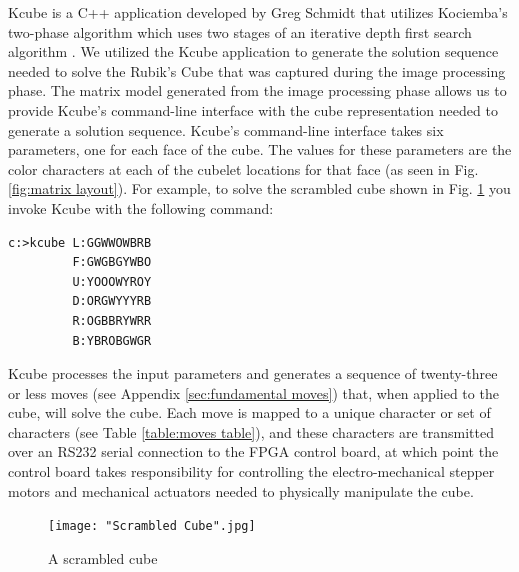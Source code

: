 \documentclass[final, letterpaper, 10 pt, conference, twocolumn]{IEEEtran}
\begin{document}
\label{sec:Kcube}
Kcube is a C++ application developed by Greg Schmidt that utilizes Kociemba's two-phase algorithm which uses two stages of an iterative depth first search algorithm \cite{TheTwo-PhaseAlgorithm}. We utilized the Kcube application to generate the solution sequence needed to solve the Rubik's Cube that was captured during the image processing phase. The matrix model generated from the image processing phase allows us to provide Kcube's command-line interface with the cube representation needed to generate a solution sequence. Kcube's command-line interface takes six parameters, one for each face of the cube. The values for these parameters are the color characters at each of the cubelet locations for that face (as seen in Fig. \ref{fig:matrix layout}). For example, to solve the scrambled cube shown in Fig. \ref{fig:scrambled cube} you invoke Kcube with the following command:

\begin{lstlisting}[style=DOS]
c:>kcube L:GGWWOWBRB
         F:GWGBGYWBO
         U:YOOOWYROY
         D:ORGWYYYRB
         R:OGBBRYWRR
         B:YBROBGWGR
\end{lstlisting}

Kcube processes the input parameters and generates a sequence of twenty-three or less moves (see Appendix \ref{sec:fundamental moves}) that, when applied to the cube, will solve the cube. Each move is mapped to a unique character or set of characters (see Table \ref{table:moves table}), and these characters are transmitted over an RS232 serial connection to the FPGA control board, at which point the control board takes responsibility for controlling the electro-mechanical stepper motors and mechanical actuators needed to physically manipulate the cube.


\begin{figure}[!hb]
\centering
\texttt{[image: "Scrambled Cube".jpg]}
\caption{A scrambled cube}
\label{fig:scrambled cube}
\end{figure}
\end{document}
